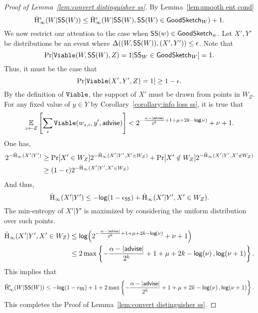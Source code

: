 \begin{proof}[Proof of Lemma~\ref{lem:convert distinguisher ss}]
By Lemma~\ref{lem:smooth ent cond}
\[
\tilde{\mathrm{H}}_\infty^\epsilon(W| {\mathsf{SS}}(W)) \le \tilde{\mathrm{H}}_\infty^\epsilon(W| {\mathsf{SS}}(W), {\mathsf{SS}}(W)\in \mathsf{GoodSketch}_W) +1.
\]
We now restrict our attention to the case when ${\mathsf{SS}}(w) \in \mathsf{GoodSketch}_w$.   
Let $X', Y'$ be distributions  be an event where $\Delta((W, {\mathsf{SS}}(W)), (X', Y'))\le \epsilon$. Note that 
\[
\Pr[\mathtt{Viable}(W, {\mathsf{SS}}(W), Z) = 1| {\mathsf{SS}}_W \in \mathsf{GoodSketch}_W] = 1.
\]
Thus, it must be the case that 
\[
\Pr[\mathtt{Viable}(X', Y', Z) = 1] \ge 1-\epsilon.
\]
By the definition of $\mathtt{Viable}$, the support of $X'$ must be drawn from points in $W_Z$.  For any fixed value of $y\in Y$ by Corollary~\ref{corollary:info loss ss}, it is true that 
\begin{align*}
\operatorname*{\mathbb{E}}_{z\leftarrow Z} \left[\sum_{i }  \mathtt{Viable}(w_{z,i}, y', {\mathsf{advise}})  \right]< 2^{-\frac{\alpha-|{\mathsf{advise}}|}{2^k}+1+\mu+2k-\mathsf{log}\!\left(\nu\right)}+\nu+1.
\end{align*}
One has, 
\begin{align*}
2^{-\tilde{\mathrm{H}}_\infty(X'|Y')} &\ge  \Pr[X' \in W_Z] 2^{-\tilde{\mathrm{H}}_\infty(X'|Y', X'\in W_Z) }+ \Pr[X'\not\in W_Z] 2^{-\tilde{\mathrm{H}}_\infty(X'|Y', X'\not\in W_Z)}\\
 &\ge  (1-\epsilon)2^{-\tilde{\mathrm{H}}_\infty(X'|Y', X'\in W_Z) }
\end{align*}
And thus, 
\[
\tilde{\mathrm{H}}_\infty(X'|Y') \le  -\mathsf{log}\!\left(1-\epsilon_{\mathsf{SS}}\right) +\tilde{\mathrm{H}}_\infty(X'|Y', X'\in W_Z).
\]
The min-entropy of $X' |Y'$ is maximized by considering the uniform distribution over such points. \begin{align*}
\tilde{\mathrm{H}}_\infty(X'|Y' , X'\in W_Z) &\le \mathsf{log}\!\left(2^{-\frac{\alpha-|{\mathsf{advise}}|}{2^k}+1+\mu+2k-\mathsf{log}\!\left(\nu\right)}+\nu+1\right)\\
&\le 2\max\left\{-\frac{\alpha-|{\mathsf{advise}}|}{2^k}+1+\mu+2k-\mathsf{log}\!\left(\nu\right), \mathsf{log}\!\left(\nu+1\right)\right\}.
\end{align*}
This implies that 
\[
\tilde{\mathrm{H}}_\infty^\epsilon(W| {\mathsf{SS}}(W)) \le -\mathsf{log}\!\left(1-\epsilon_{\mathsf{SS}}\right) +1 + 2\max\left\{-\frac{\alpha-|{\mathsf{advise}}|}{2^k}+1+\mu+2k-\mathsf{log}\!\left(\nu\right), \mathsf{log}\!\left(\nu+1\right)\right\}.
\]
This completes the Proof of Lemma~\ref{lem:convert distinguisher ss}.
\end{proof}

